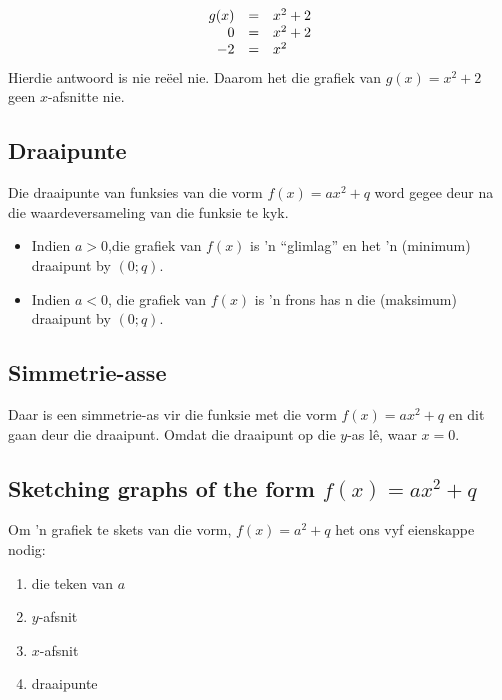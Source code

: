\begin{equation*}
\begin{array}{ccl}\hfill g(x)& =& {x}^{2}+2\hfill \\
 \hfill 0& =& x^{2}+2\hfill \\
 \hfill -2& =& x^{2}\hfill 
\end{array}
\end{equation*}
Hierdie antwoord is nie reëel nie. Daarom het die grafiek van $g(x)={x}^{2}+2$ geen $x$-afsnitte nie. 

\subsection*{Draaipunte}

Die draaipunte van funksies van die vorm $f(x)=ax^{2}+q$ word gegee deur na die waardeversameling van
die funksie te kyk. 
\begin{itemize}
 \item Indien $a>0$,die grafiek van $f(x)$ is 'n ``glimlag'' en het 'n (minimum) draaipunt by $(0;q)$.
\item Indien $a<0$,  die grafiek van $f(x)$ is 'n frons has n die (maksimum)
draaipunt by $(0;q)$.
\end{itemize}


\subsection*{Simmetrie-asse}

Daar is een simmetrie-as vir die funksie met die vorm $f(x)=ax^{2}+q$ en dit gaan deur die draaipunt. Omdat die draaipunt op die $y$-as lê, waar $x=0$. 

\subsection*{Sketching graphs of the form $f(x)=ax^{2}+q$}

Om ’n grafiek te skets van die vorm, $f(x)=a^{2}+q$ het ons vyf eienskappe nodig:
\begin{enumerate}[noitemsep, label=\textbf{\arabic*}. ] 
\item die teken van $a$
\item $y$-afsnit
\item $x$-afsnit
\item draaipunte

\end{enumerate}

